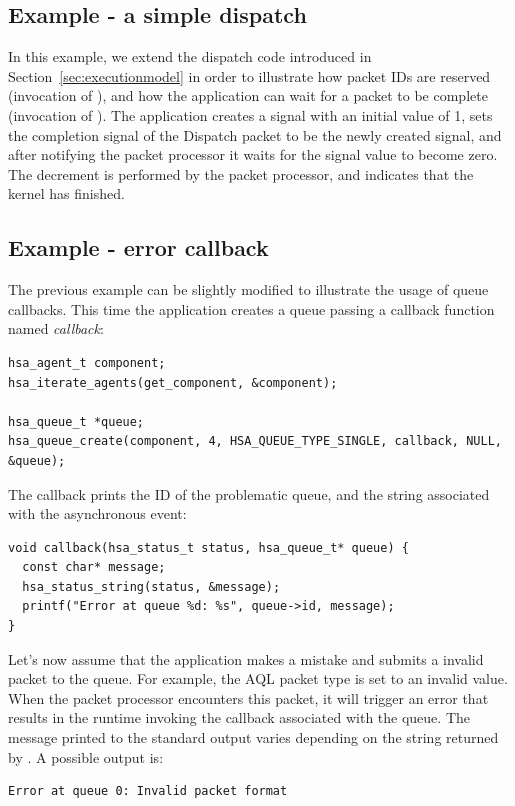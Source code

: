 \documentclass[final]{book}
\begin{document}
\subsection{Example - a simple dispatch}
In this example, we extend the dispatch code introduced in
Section~\ref{sec:executionmodel} in order to illustrate how packet IDs are
reserved (invocation of ), and how the
application can wait for a packet to be complete (invocation of
). The application creates a signal with an
initial value of 1, sets the completion signal of the Dispatch packet to be the
newly created signal, and after notifying the packet processor it
waits for the signal value to become zero. The decrement is performed by the
packet processor, and indicates that the kernel has finished.



\subsection{Example - error callback}
The previous example can be slightly modified to illustrate the usage of queue
callbacks. This time the application creates a queue passing a callback function
named \emph{callback}:
\begin{lstlisting}
hsa_agent_t component;
hsa_iterate_agents(get_component, &component);

hsa_queue_t *queue;
hsa_queue_create(component, 4, HSA_QUEUE_TYPE_SINGLE, callback, NULL, &queue);
\end{lstlisting}

The callback prints the ID of the problematic queue, and the string associated
with the asynchronous event:
\begin{lstlisting}
void callback(hsa_status_t status, hsa_queue_t* queue) {
  const char* message;
  hsa_status_string(status, &message);
  printf("Error at queue %d: %s", queue->id, message);
}
\end{lstlisting}
Let's now assume that the application makes a mistake and submits a invalid
packet to the queue. For example, the AQL packet type is set to an invalid
value. When the packet processor encounters this packet, it will trigger an
error that results in the runtime invoking the callback associated with the
queue. The message printed to the standard output varies depending on the string
returned by . A possible output is:
\begin{lstlisting}
Error at queue 0: Invalid packet format
\end{lstlisting}
\end{document}
